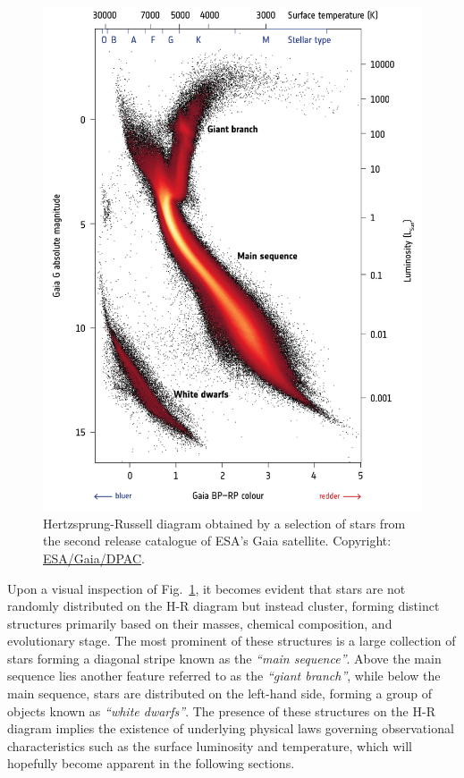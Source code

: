 \documentclass[main.tex]{subfiles}
\begin{document}
    \begin{figure}[h!]
        \centering
        \includegraphics[scale=0.25]{figures/chapter1/hrd_gaia.png}
        \caption{Hertzsprung-Russell diagram obtained by a selection of stars from the second release catalogue of ESA's Gaia satellite. Copyright: \href{https://sci.esa.int/web/gaia/-/60198-gaia-hertzsprung-russell-diagram}{ESA/Gaia/DPAC}.}
        \label{fig:hrd_gaia}
    \end{figure}

    Upon a visual inspection of Fig.~\ref{fig:hrd_gaia}, it becomes evident that stars are not randomly distributed on the H-R diagram but instead cluster, forming distinct structures primarily based on their masses, chemical composition, and evolutionary stage. The most prominent of these structures is a large collection of stars forming a diagonal stripe known as the \textit{``main sequence''}. Above the main sequence lies another feature referred to as the \textit{``giant branch''}, while below the main sequence, stars are distributed on the left-hand side, forming a group of objects known as \textit{``white dwarfs''}. The presence of these structures on the H-R diagram implies the existence of underlying physical laws governing observational characteristics such as the surface luminosity and temperature, which will hopefully become apparent in the following sections.
\end{document}
